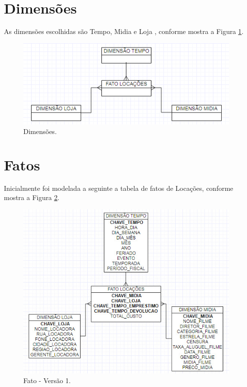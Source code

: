 \section{Dimensões}

As dimensões escolhidas são Tempo, Midia e Loja , conforme mostra a Figura \ref{fig:dimensoes}.  

\begin{figure}[!htb]
   \centering
   \caption{Dimensões.}\label{fig:dimensoes} 
   \includegraphics[scale=0.7]{imagens/img1.png}
\end{figure}

\section{Fatos}

Inicialmente foi modelada a seguinte a tabela de fatos de Locações, conforme mostra a Figura \ref{fig:fato0}.


\begin{figure}[!htb]
   \centering
   \caption{Fato - Versão 1.}\label{fig:fato0} 
   \includegraphics[scale=0.5]{imagens/fato-0.jpeg}
\end{figure}

